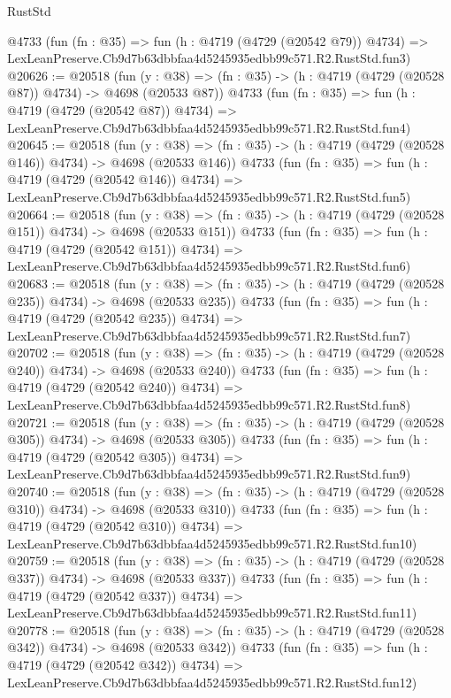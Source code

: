 \begin{lexlean}{RustStd}
\begin{coremodule}
    @4733
    (fun (fn : @35) =>
    fun (h : @4719 (@4729 (@20542 @79)) @4734) =>
    LexLeanPreserve.Cb9d7b63dbbfaa4d5245935edbb99c571.R2.RustStd.fun3)
@20626 := @20518
    (fun (y : @38) => (fn : @35) -> (h : @4719 (@4729 (@20528 @87)) @4734) -> @4698 (@20533 @87))
    @4733
    (fun (fn : @35) =>
    fun (h : @4719 (@4729 (@20542 @87)) @4734) =>
    LexLeanPreserve.Cb9d7b63dbbfaa4d5245935edbb99c571.R2.RustStd.fun4)
@20645 := @20518
    (fun (y : @38) => (fn : @35) -> (h : @4719 (@4729 (@20528 @146)) @4734) -> @4698 (@20533 @146))
    @4733
    (fun (fn : @35) =>
    fun (h : @4719 (@4729 (@20542 @146)) @4734) =>
    LexLeanPreserve.Cb9d7b63dbbfaa4d5245935edbb99c571.R2.RustStd.fun5)
@20664 := @20518
    (fun (y : @38) => (fn : @35) -> (h : @4719 (@4729 (@20528 @151)) @4734) -> @4698 (@20533 @151))
    @4733
    (fun (fn : @35) =>
    fun (h : @4719 (@4729 (@20542 @151)) @4734) =>
    LexLeanPreserve.Cb9d7b63dbbfaa4d5245935edbb99c571.R2.RustStd.fun6)
@20683 := @20518
    (fun (y : @38) => (fn : @35) -> (h : @4719 (@4729 (@20528 @235)) @4734) -> @4698 (@20533 @235))
    @4733
    (fun (fn : @35) =>
    fun (h : @4719 (@4729 (@20542 @235)) @4734) =>
    LexLeanPreserve.Cb9d7b63dbbfaa4d5245935edbb99c571.R2.RustStd.fun7)
@20702 := @20518
    (fun (y : @38) => (fn : @35) -> (h : @4719 (@4729 (@20528 @240)) @4734) -> @4698 (@20533 @240))
    @4733
    (fun (fn : @35) =>
    fun (h : @4719 (@4729 (@20542 @240)) @4734) =>
    LexLeanPreserve.Cb9d7b63dbbfaa4d5245935edbb99c571.R2.RustStd.fun8)
@20721 := @20518
    (fun (y : @38) => (fn : @35) -> (h : @4719 (@4729 (@20528 @305)) @4734) -> @4698 (@20533 @305))
    @4733
    (fun (fn : @35) =>
    fun (h : @4719 (@4729 (@20542 @305)) @4734) =>
    LexLeanPreserve.Cb9d7b63dbbfaa4d5245935edbb99c571.R2.RustStd.fun9)
@20740 := @20518
    (fun (y : @38) => (fn : @35) -> (h : @4719 (@4729 (@20528 @310)) @4734) -> @4698 (@20533 @310))
    @4733
    (fun (fn : @35) =>
    fun (h : @4719 (@4729 (@20542 @310)) @4734) =>
    LexLeanPreserve.Cb9d7b63dbbfaa4d5245935edbb99c571.R2.RustStd.fun10)
@20759 := @20518
    (fun (y : @38) => (fn : @35) -> (h : @4719 (@4729 (@20528 @337)) @4734) -> @4698 (@20533 @337))
    @4733
    (fun (fn : @35) =>
    fun (h : @4719 (@4729 (@20542 @337)) @4734) =>
    LexLeanPreserve.Cb9d7b63dbbfaa4d5245935edbb99c571.R2.RustStd.fun11)
@20778 := @20518
    (fun (y : @38) => (fn : @35) -> (h : @4719 (@4729 (@20528 @342)) @4734) -> @4698 (@20533 @342))
    @4733
    (fun (fn : @35) =>
    fun (h : @4719 (@4729 (@20542 @342)) @4734) =>
    LexLeanPreserve.Cb9d7b63dbbfaa4d5245935edbb99c571.R2.RustStd.fun12)

\end{coremodule}
\end{lexlean}
